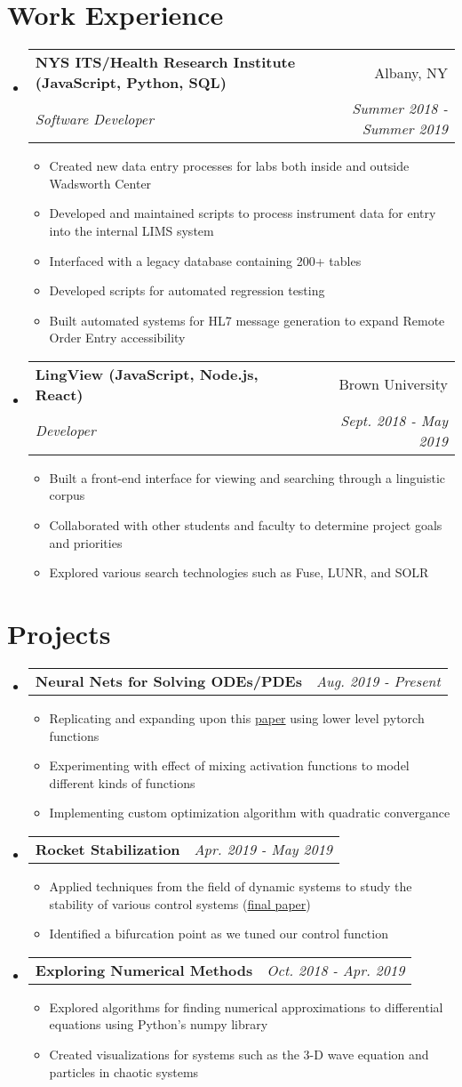 \documentclass[letterpaper,11pt]{article}
\makeatletter
\newcommand{\resumeItem}[2]{
  \item\small{
    \textbf{#1}{#2 \vspace{-2pt}}
  }
}
\newcommand{\resumeSubheading}[4]{
  \vspace{-1pt}\item
    \begin{tabular*}{0.97\textwidth}{l@{\extracolsep{\fill}}r}
      \textbf{#1} & #2 \\
      \textit{\small#3} & \textit{\small #4} \\
    \end{tabular*}\vspace{-5pt}
}
\newcommand{\resumeSubheadingSimple}[2]{
  \vspace{-1pt}\item
    \begin{tabular*}{0.97\textwidth}{l@{\extracolsep{\fill}}r}
      \textbf{#1} & \textit{\small#2}\\
    \end{tabular*}\vspace{-5pt}
}
\newcommand{\resumeSubHeadingListStart}{\begin{itemize}[leftmargin=*]}
\newcommand{\resumeSubHeadingListEnd}{\end{itemize}}
\newcommand{\resumeItemListStart}{\begin{itemize}}
\newcommand{\resumeItemListEnd}{\end{itemize}\vspace{-5pt}}
\makeatother
\begin{document}
\section{Work Experience}
  \resumeSubHeadingListStart
    \resumeSubheading{NYS ITS/Health Research Institute (JavaScript, Python, SQL)}
    {Albany, NY}{Software Developer}{Summer 2018 - Summer 2019}
      \resumeItemListStart
        \resumeItem{}
        {Created new data entry processes for labs both inside and outside Wadsworth Center}
        \resumeItem{}
        {Developed and maintained scripts to process instrument data for entry into the internal LIMS system}
        \resumeItem{}
        {Interfaced with a legacy database containing 200+ tables}
        \resumeItem{}
        {Developed scripts for automated regression testing}
        \resumeItem{}
        {Built automated systems for HL7 message generation to expand Remote Order Entry accessibility}
      \resumeItemListEnd
    \resumeSubheading{LingView (JavaScript, Node.js, React)}{Brown University}{Developer}{Sept. 2018 - May 2019}
      \resumeItemListStart
        \resumeItem{}
        {Built a front-end interface for viewing and searching through a linguistic corpus}
        \resumeItem{}
        {Collaborated with other students and faculty to determine project goals and priorities}
        \resumeItem{}
        {Explored various search technologies such as Fuse, LUNR, and SOLR}
      \resumeItemListEnd
  \resumeSubHeadingListEnd

\section{Projects}
    \resumeSubHeadingListStart
        \resumeSubheadingSimple
          {Neural Nets for Solving ODEs/PDEs}{Aug. 2019 - Present}
          \resumeItemListStart
            \resumeItem{}
            {Replicating and expanding upon this \href{https://arxiv.org/abs/physics/9705023}{paper} using lower level pytorch functions}
            \resumeItem{}
            {Experimenting with effect of mixing activation functions to model different kinds of functions}
            \resumeItem{}
            {Implementing custom optimization algorithm with quadratic convergance}
          \resumeItemListEnd
        \resumeSubheadingSimple
          {Rocket Stabilization}{Apr. 2019 - May 2019}
          \resumeItemListStart
            \resumeItem{}
            {Applied techniques from the field of dynamic systems to study the stability of various control systems (\href{https://github.com/IzzyBrand/tvc\_rocket\_model/blob/master/all_the_math.pdf}{final paper})}
            \resumeItem{}
            {Identified a bifurcation point as we tuned our control function}
          \resumeItemListEnd
        \resumeSubheadingSimple
          {Exploring Numerical Methods}{Oct. 2018 - Apr. 2019}
          \resumeItemListStart
            \resumeItem{}
              {Explored algorithms for finding numerical approximations to differential equations using Python's numpy library}
            \resumeItem{}
              {Created visualizations for systems such as the 3-D wave equation and particles in chaotic systems}
          \resumeItemListEnd
    \resumeSubHeadingListEnd
\end{document}

